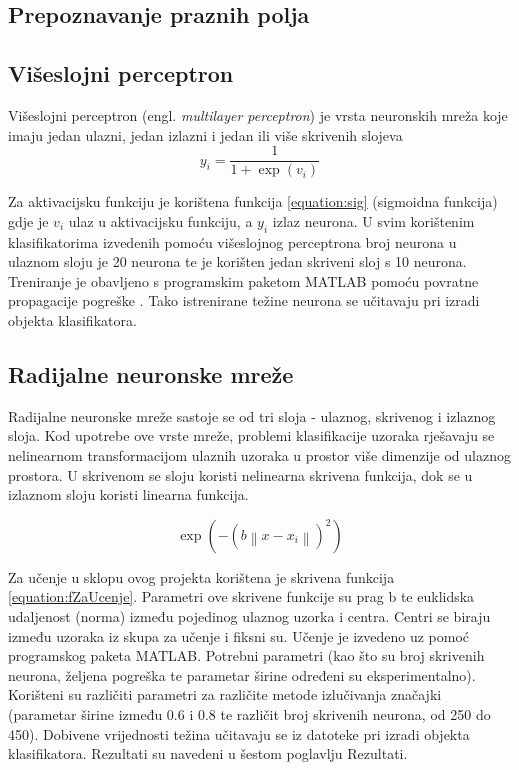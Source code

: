 \documentclass[a4paper,twocolumn,dvipdfm]{article}
\begin{document}
\subsection{Prepoznavanje praznih polja}

\subsection{Višeslojni perceptron}
Višeslojni perceptron \cite{rosenblatt1958perceptron} (engl. \emph{multilayer
perceptron}) je vrsta neuronskih mreža koje imaju jedan ulazni, jedan izlazni i
jedan ili više skrivenih slojeva
\begin{equation}
y_i = \frac{1}{1 + \exp(v_i)}
\label{equation:sig}
\end{equation}

Za aktivacijsku funkciju je korištena funkcija \ref{equation:sig} (sigmoidna
funkcija) gdje je $v_i$ ulaz u aktivacijsku funkciju, a $y_i$ izlaz neurona. U
svim korištenim klasifikatorima izvedenih pomoću višeslojnog perceptrona broj
neurona u ulaznom sloju je 20 neurona te je korišten jedan skriveni sloj s 10
neurona. Treniranje je obavljeno s programskim paketom MATLAB pomoću povratne
propagacije pogreške \cite{rumelhart1986learning}. Tako istrenirane težine
neurona se učitavaju pri izradi objekta klasifikatora.

\subsection{Radijalne neuronske mreže}
Radijalne neuronske mreže sastoje se od tri sloja - ulaznog, skrivenog i
izlaznog sloja. Kod upotrebe ove vrste mreže, problemi klasifikacije uzoraka
rješavaju se nelinearnom transformacijom ulaznih uzoraka u prostor više
dimenzije od ulaznog prostora. U skrivenom se sloju koristi nelinearna skrivena
funkcija, dok se u izlaznom sloju koristi linearna funkcija.

\begin{equation}
\exp(-\left (b \left \| x - x_{i} \right \|  \right )^{2})
\label{equation:fZaUcenje}
\end{equation}

Za učenje u sklopu ovog projekta korištena je skrivena funkcija
\ref{equation:fZaUcenje}. Parametri ove skrivene funkcije su prag b te euklidska
udaljenost (norma) između pojedinog ulaznog uzorka i centra. Centri se biraju
između uzoraka iz skupa za učenje i fiksni su. Učenje je izvedeno uz pomoć
programskog paketa MATLAB. Potrebni parametri (kao što su broj skrivenih
neurona, željena pogreška te parametar širine određeni su eksperimentalno).
Korišteni su različiti parametri za  različite metode izlučivanja značajki
(parametar širine između 0.6 i 0.8 te različit broj skrivenih neurona, od 250 do
450). Dobivene vrijednosti težina učitavaju se iz datoteke pri izradi objekta
klasifikatora. Rezultati su navedeni u šestom poglavlju Rezultati.
\end{document}
